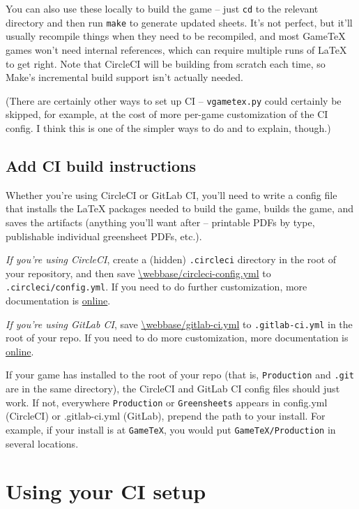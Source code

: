 \documentclass[green]{testgame}
\begin{document}
You can also use these locally to build the game -- just \texttt{cd} to the relevant directory and then run \texttt{make} to generate updated sheets. It's not perfect, but it'll usually recompile things when they need to be recompiled, and most GameTeX games won't need internal references, which can require multiple runs of \LaTeX{} to get right. Note that CircleCI will be building from scratch each time, so Make's incremental build support isn't actually needed.

(There are certainly other ways to set up CI -- \texttt{vgametex.py} could certainly be skipped, for example, at the cost of more per-game customization of the CI config. I think this is one of the simpler ways to do and to explain, though.)

\subsection{Add CI build instructions}

Whether you're using CircleCI or GitLab CI, you'll need to write a config file that installs the LaTeX packages needed to build the game, builds the game, and saves the artifacts (anything you'll want after -- printable PDFs by type, publishable individual greensheet PDFs, etc.).

\emph{If you're using CircleCI}, create a (hidden) \texttt{.circleci} directory in the root of your repository, and then save \url{\webbase/circleci-config.yml} to \texttt{.circleci/config.yml}. If you need to do further customization, more documentation is \href{https://circleci.com/docs/2.0/configuration-reference/}{online}.

\emph{If you're using GitLab CI}, save \url{\webbase/gitlab-ci.yml} to \texttt{.gitlab-ci.yml} in the root of your repo. If you need to do more customization, more documentation is \href{https://docs.gitlab.com/ee/ci/quick_start/README.html}{online}.

If your game has \GameTeX{} installed to the root of your repo (that is, \texttt{Production} and \texttt{.git} are in the same directory), the CircleCI and GitLab CI config files should just work. If not, everywhere \texttt{Production} or \texttt{Greensheets} appears in config.yml (CircleCI) or .gitlab-ci.yml (GitLab), prepend the path to your \GameTeX{} install. For example, if your \GameTeX{} install is at \texttt{GameTeX}, you would put \texttt{GameTeX/Production} in several locations.


\section{Using your CI setup}
\end{document}
